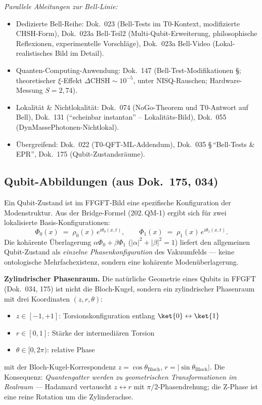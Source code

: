 \textit{Parallele Ableitungen zur Bell-Linie:}
\begin{itemize}\setlength\itemsep{0pt}
  \item Dedizierte Bell-Reihe:
        Dok.~023 (Bell-Tests im T0-Kontext, modifizierte CHSH-Form),
        Dok.~023a Bell-Teil2 (Multi-Qubit-Erweiterung, philosophische
        Reflexionen, experimentelle Vorschläge),
        Dok.~023a Bell-Video (Lokal-realistisches Bild im Detail).
  \item Quanten-Computing-Anwendung:
        Dok.~147 (Bell-Test-Modifikationen \S; theoretischer
        $\xi$-Effekt $\Delta\mathrm{CHSH} \sim 10^{-5}$, unter
        NISQ-Rauschen; Hardware-Messung $S=2{,}74$).
  \item Lokalität \& Nichtlokalität:
        Dok.~074 (NoGo-Theorem und T0-Antwort auf Bell),
        Dok.~131 (\enquote{scheinbar instantan} -- Lokalitäts-Bild),
        Dok.~055 (DynMassePhotonen-Nichtlokal).
  \item Übergreifend:
        Dok.~022 (T0-QFT-ML-Addendum),
        Dok.~035 \S\,\enquote{Bell-Tests \& EPR},
        Dok.~175 (Qubit-Zustandsräume).
\end{itemize}

\subsection*{Qubit-Abbildungen (aus Dok.~175, 034)}

Ein Qubit-Zustand ist im FFGFT-Bild eine spezifische Konfiguration
der Modenstruktur. Aus der Bridge-Formel (202.\,QM-1) ergibt sich für
zwei lokalisierte Basis-Konfigurationen:
\begin{equation}
  \Phi_0(x) \;=\; \rho_0(x)\,e^{i\theta_0(x,t)},
  \qquad
  \Phi_1(x) \;=\; \rho_1(x)\,e^{i\theta_1(x,t)}.
  \tag{202.\,QM-7}
\end{equation}
Die kohärente Überlagerung
$\alpha\Phi_0 + \beta\Phi_1$ ($|\alpha|^2 + |\beta|^2 = 1$) liefert den
allgemeinen Qubit-Zustand als \emph{einzelne Phasenkonfiguration} des
Vakuumfelds --- keine ontologische Mehrfach\-existenz, sondern eine
kohärente Modenüberlagerung.

\textbf{Zylindrischer Phasenraum.} Die natürliche Geometrie eines
Qubits in FFGFT (Dok.~034, 175) ist nicht die Bloch-Kugel, sondern
ein zylindrischer Phasenraum mit drei Koordinaten $(z, r, \theta)$:
\begin{itemize}\setlength\itemsep{0pt}
  \item $z \in [-1, +1]$: Torsions\-konfiguration entlang
        $\ket{0} \leftrightarrow \ket{1}$
  \item $r \in [0, 1]$: Stärke der intermediären Torsion
  \item $\theta \in [0, 2\pi)$: relative Phase
\end{itemize}
mit der Bloch-Kugel-Korrespondenz $z = \cos\theta_{\text{Bloch}}$,
$r = |\sin\theta_{\text{Bloch}}|$. Die Konsequenz: \emph{Quantengatter
werden zu geometrischen Transformationen im Realraum} --- Hadamard
vertauscht $z \leftrightarrow r$ mit $\pi/2$-Phasendrehung; die
Z-Phase ist eine reine Rotation um die Zylinderachse.

